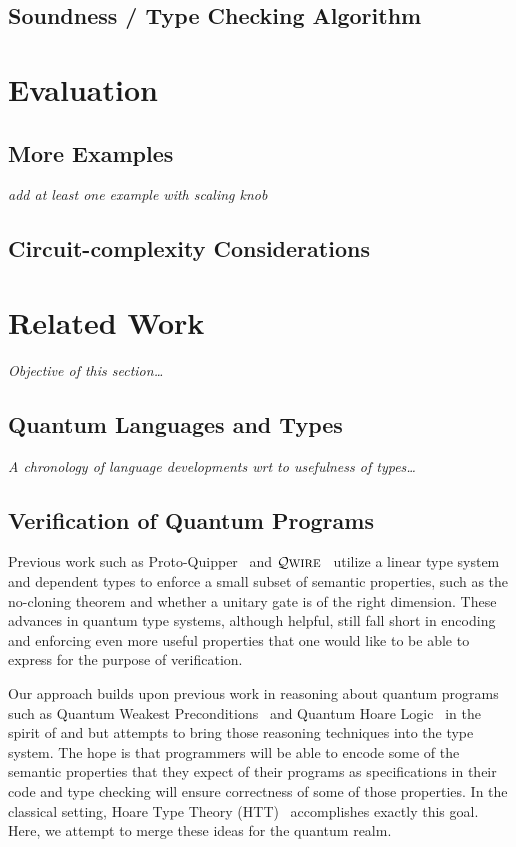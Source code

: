 \documentclass[acmsmall,nonacm,timestamp]{acmart}
\newcommand{\qwire}{\ensuremath{\mathcal{Q}\textsc{wire}}\xspace}
\begin{document}
\subsection{Soundness / Type Checking Algorithm}

\section{Evaluation}

\subsection{More Examples}
\textit{add at least one example with scaling knob}

\subsection{Circuit-complexity Considerations}

\section{Related Work}
\textit{Objective of this section\ldots}

\subsection{Quantum Languages and Types}
\textit{A chronology of language developments wrt to usefulness of types\ldots}

\subsection{Verification of Quantum Programs}
Previous work such as Proto-Quipper~\cite{ross_algebraic_2015,mahmoud_formalization_2019,rios_categorical_2017} and \qwire~\cite{paykin_qwire:_2017,rand_qwire_2017,rand_formally_2018} utilize a linear type system and dependent types to enforce a small subset of semantic properties, such as the no-cloning theorem and whether a unitary gate is of the right dimension. These advances in quantum type systems, although helpful, still fall short in encoding and enforcing even more useful properties that one would like to be able to express for the purpose of verification.

Our approach builds upon previous work in reasoning about quantum programs such as Quantum Weakest Preconditions~\cite{dhondt_quantum_2006} and Quantum Hoare Logic~\cite{ying_floydhoare_2012} in the spirit of \citet{hoare_axiomatic_1969} and \citet{dijkstra_discipline_1976} but attempts to bring those reasoning techniques into the type system. The hope is that programmers will be able to encode some of the semantic properties that they expect of their programs as specifications in their code and type checking will ensure correctness of some of those properties. In the classical setting, Hoare Type Theory (HTT)~\cite{nanevski_hoare_2008} accomplishes exactly this goal. Here, we attempt to merge these ideas for the quantum realm.
\end{document}
